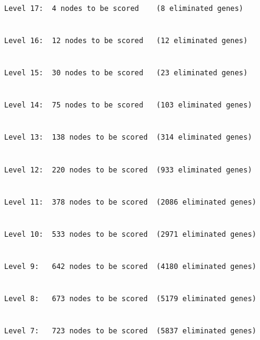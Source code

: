 \documentclass[]{article}
\begin{document}
\begin{verbatim}

     Level 17:  4 nodes to be scored    (8 eliminated genes)
\end{verbatim}

\begin{verbatim}

     Level 16:  12 nodes to be scored   (12 eliminated genes)
\end{verbatim}

\begin{verbatim}

     Level 15:  30 nodes to be scored   (23 eliminated genes)
\end{verbatim}

\begin{verbatim}

     Level 14:  75 nodes to be scored   (103 eliminated genes)
\end{verbatim}

\begin{verbatim}

     Level 13:  138 nodes to be scored  (314 eliminated genes)
\end{verbatim}

\begin{verbatim}

     Level 12:  220 nodes to be scored  (933 eliminated genes)
\end{verbatim}

\begin{verbatim}

     Level 11:  378 nodes to be scored  (2086 eliminated genes)
\end{verbatim}

\begin{verbatim}

     Level 10:  533 nodes to be scored  (2971 eliminated genes)
\end{verbatim}

\begin{verbatim}

     Level 9:   642 nodes to be scored  (4180 eliminated genes)
\end{verbatim}

\begin{verbatim}

     Level 8:   673 nodes to be scored  (5179 eliminated genes)
\end{verbatim}

\begin{verbatim}

     Level 7:   723 nodes to be scored  (5837 eliminated genes)
\end{verbatim}
\end{document}
